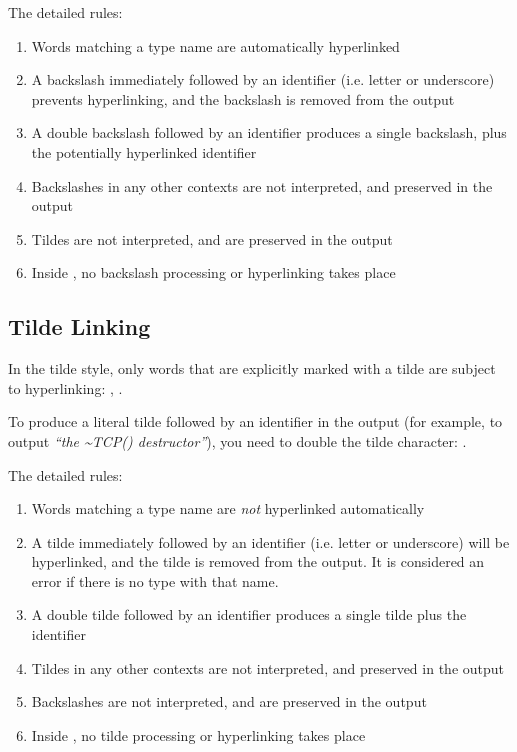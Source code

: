 The detailed rules:

\begin{enumerate}
  \item Words matching a type name are automatically hyperlinked
  \item A backslash immediately followed by an identifier (i.e. letter or underscore)
        prevents hyperlinking, and the backslash is removed from the output
  \item A double backslash followed by an identifier produces a single backslash,
        plus the potentially hyperlinked identifier
  \item Backslashes in any other contexts are not interpreted, and preserved in the output
  \item Tildes are not interpreted, and are preserved in the output
  \item Inside , no backslash processing or hyperlinking takes place
\end{enumerate}

\subsection{Tilde Linking}

In the tilde style, only words that are explicitly marked with a tilde are
subject to hyperlinking: ,
.

To produce a literal tilde followed by an identifier in the output (for example,
to output \textit{``the {\textasciitilde}TCP() destructor''}), you need to
double the tilde character: .

The detailed rules:

\begin{enumerate}
  \item Words matching a type name are \textit{not} hyperlinked automatically
  \item A tilde immediately followed by an identifier (i.e. letter or underscore)
        will be hyperlinked, and the tilde is removed from the output. It is
        considered an error if there is no type with that name.
  \item A double tilde followed by an identifier produces a single tilde plus the identifier
  \item Tildes in any other contexts are not interpreted, and preserved in the output
  \item Backslashes are not interpreted, and are preserved in the output
  \item Inside , no tilde processing or hyperlinking takes place
\end{enumerate}

